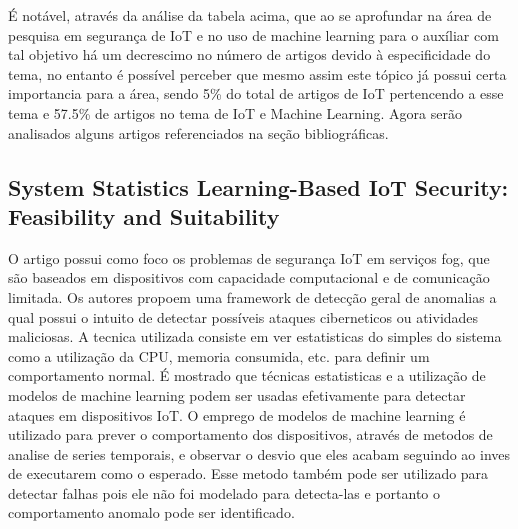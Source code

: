 \documentclass[article]{abntex2}
\begin{document}
É notável, através da análise da tabela acima, que ao se aprofundar na área de pesquisa em segurança de IoT e no uso de machine learning para o auxíliar com tal objetivo há um decrescimo no número de artigos devido à especificidade do tema, no entanto é possível perceber que mesmo assim este tópico já possui certa importancia para a área, sendo 5\% do total de artigos de IoT pertencendo a esse tema e 57.5\% de artigos no tema de IoT e Machine Learning. Agora serão analisados alguns artigos referenciados na seção bibliográficas.
\subsection{System Statistics Learning-Based IoT Security: Feasibility and Suitability}%
O artigo possui como foco os problemas de segurança IoT em serviços fog, que são baseados em dispositivos com capacidade computacional e de comunicação limitada. Os autores propoem uma framework de detecção geral de anomalias a qual possui o intuito de detectar possíveis ataques ciberneticos ou atividades maliciosas. A tecnica utilizada consiste em ver estatisticas do simples do sistema como a utilização da CPU, memoria consumida, etc. para definir um comportamento normal. É mostrado que técnicas estatisticas e a utilização de modelos de machine learning podem ser usadas efetivamente para detectar ataques em dispositivos IoT. O emprego de modelos de machine learning é utilizado para prever o comportamento dos dispositivos, através  de metodos de analise de series temporais, e observar o desvio que eles acabam seguindo ao inves de executarem como o esperado. Esse metodo também pode ser utilizado para detectar falhas pois ele não foi modelado para detecta-las e portanto o comportamento anomalo pode ser identificado.
\end{document}
